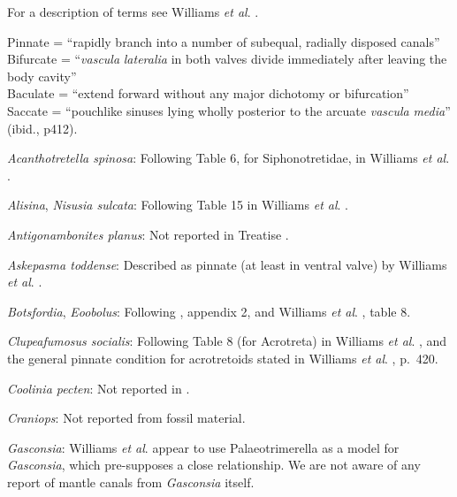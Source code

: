 \documentclass[openany]{book}
\begin{document}
For a description of terms see Williams \emph{et al}.
\citeyearpar[2000]{Williams1997Introduction}.

Pinnate = ``rapidly branch into a number of subequal, radially disposed
canals''\\
Bifurcate = ``\emph{vascula} \emph{lateralia} in both valves divide
immediately after leaving the body cavity''\\
Baculate = ``extend forward without any major dichotomy or bifurcation''
\citep[ p.~418]{Williams1997Introduction}\\
Saccate = ``pouchlike sinuses lying wholly posterior to the arcuate
\emph{vascula} \emph{media}'' (ibid., p412).

\hypertarget{Acanthotretella_spinosa-coding-36}{}
\emph{Acanthotretella spinosa}: Following Table 6, for Siphonotretidae,
in Williams \emph{et al}.
\citeyearpar{Williams2000LinguliformeaCraniiformea}.

\hypertarget{Alisina-coding-36}{}
\emph{Alisina}, \emph{Nisusia sulcata}: Following Table 15 in Williams
\emph{et al}. \citeyearpar{Williams2000LinguliformeaCraniiformea}.

\hypertarget{Antigonambonites_planus-coding-36}{}
\emph{Antigonambonites planus}: Not reported in Treatise
\citep{Williams2000LinguliformeaCraniiformea}.

\hypertarget{Askepasma_toddense-coding-36}{}
\emph{Askepasma toddense}: Described as pinnate (at least in ventral
valve) by Williams \emph{et al}.
\citeyearpar[p.~250]{Williams1998Thediversity}.

\hypertarget{Botsfordia-coding-36}{}
\emph{Botsfordia}, \emph{Eoobolus}: Following
\citet{Williams1998Thediversity}, appendix 2, and Williams \emph{et al}.
\citeyearpar{Williams2000LinguliformeaCraniiformea}, table 8.

\hypertarget{Clupeafumosus_socialis-coding-36}{}
\emph{Clupeafumosus socialis}: Following Table 8 (for Acrotreta) in
Williams \emph{et al}.
\citeyearpar{Williams2000LinguliformeaCraniiformea}, and the general
pinnate condition for acrotretoids stated in Williams \emph{et al}.
\citeyearpar{Williams1997Introduction}, p.~420.

\hypertarget{Coolinia_pecten-coding-36}{}
\emph{Coolinia pecten}: Not reported in
\citet{Williams2000LinguliformeaCraniiformea}.

\hypertarget{Craniops-coding-36}{}
\emph{Craniops}: Not reported from fossil material.

\hypertarget{Gasconsia-coding-36}{}
\emph{Gasconsia}: Williams \emph{et al}. \citeyearpar[table
15]{Williams2000LinguliformeaCraniiformea} appear to use
Palaeotrimerella \citep[as drawn in][]{Williams1997Introduction} as a
model for \emph{Gasconsia}, which pre-supposes a close relationship. We
are not aware of any report of mantle canals from \emph{Gasconsia}
itself.
\end{document}
